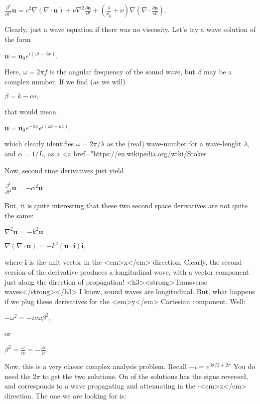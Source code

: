 $ \frac{\partial^2 }{\partial t^2 } \mathbf{u} =c^2\nabla (\nabla\cdot\mathbf{u})  + \nu  \nabla^2\frac{\partial\mathbf{u}}{\partial t}  + \left(\frac{\lambda}{\rho_0}+\nu\right) \nabla (\nabla\cdot \frac{\partial\mathbf{u}}{\partial t}   )  .$

Clearly, just a wave equation if there was no viscosity. Let's try a wave solution of the form

$ \mathbf{u} = \mathbf{u}_0 e^{i(\omega t - \beta x)} .$

Here, $ \omega=2\pi f$ is the angular frequency of the sound wave, but  $ \beta$ may be a complex number. If we find (as we will)

$  \beta =  k - \alpha i ,$

that would mean

$ \mathbf{u} = \mathbf{u}_0e^{- \alpha x} e^{i(\omega t - k x)} ,$

which clearly identifies $ \omega=2\pi /\lambda$ as the (real) wave-number for a wave-lenght $ \lambda$, and $ \alpha=1 /L $, as a <a href="https://en.wikipedia.org/wiki/Stokes%

Now, second time derivatives just yield

$ \frac{\partial^2 }{\partial t^2 } \mathbf{u} = -\alpha^2 \mathbf{u}$

But, it is quite interesting that these two second space derivatives are not quite the same:

$ \nabla^2 \mathbf{u} =  -k^2 \mathbf{u}$

$ \nabla (\nabla\cdot \mathbf{u} ) = -k^2 (\mathbf{u}\cdot\mathbf{i})\mathbf{i} ,$

where $ \mathbf{i} $ is the unit vector in the <em>x</em> direction. Clearly, the second version of the derivative produces a longitudinal wave, with a vector component just along the direction of propagation!
<h3><strong>Transverse waves</strong></h3>
I know, sound waves are longitudinal. But, what happens if we plug these derivatives for the <em>y</em> Cartesian component. Well:

$ -\omega^2 = - i \nu \omega \beta^2,$

or

$ \beta^2 = \frac{\omega}{i \nu} = - \frac{\omega i}{\nu} .$

Now, this is a very classic complex analysis problem. Recall $  -i=e^{3\pi/2+2\pi} $ You do need the $ 2\pi$ to get the two solutions. On of the solutions has the signs reversed, and corresponds to a wave propagating and attenuating in the -<em>x</em> direction. The one we are looking for is:

